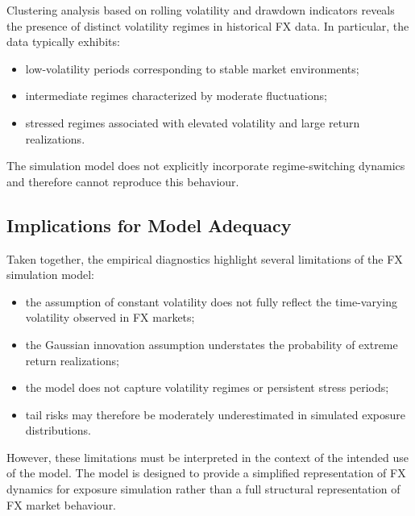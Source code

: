 Clustering analysis based on rolling volatility and drawdown indicators reveals the presence of distinct volatility regimes in historical FX data. In particular, the data typically exhibits:

\begin{itemize}
	
	\item low-volatility periods corresponding to stable market environments;
	
	\item intermediate regimes characterized by moderate fluctuations;
	
	\item stressed regimes associated with elevated volatility and large return realizations.
	
\end{itemize}

The simulation model does not explicitly incorporate regime-switching dynamics and therefore cannot reproduce this behaviour.

\subsection{Implications for Model Adequacy}

Taken together, the empirical diagnostics highlight several limitations of the FX simulation model:

\begin{itemize}
	
	\item the assumption of constant volatility does not fully reflect the time-varying volatility observed in FX markets;
	
	\item the Gaussian innovation assumption understates the probability of extreme return realizations;
	
	\item the model does not capture volatility regimes or persistent stress periods;
	
	\item tail risks may therefore be moderately underestimated in simulated exposure distributions.
	
\end{itemize}

However, these limitations must be interpreted in the context of the intended use of the model. The model is designed to provide a simplified representation of FX dynamics for exposure simulation rather than a full structural representation of FX market behaviour.

